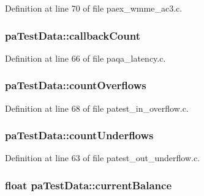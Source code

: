 Definition at line 70 of file paex\+\_\+wmme\+\_\+ac3.\+c.

\subsubsection[{\texorpdfstring{callback\+Count}{callbackCount}}]{ pa\+Test\+Data\+::callback\+Count}\hypertarget{structpa_test_data_a442020960f72390def205fc39be98203}{}\label{structpa_test_data_a442020960f72390def205fc39be98203}


Definition at line 66 of file paqa\+\_\+latency.\+c.

\subsubsection[{\texorpdfstring{count\+Overflows}{countOverflows}}]{ pa\+Test\+Data\+::count\+Overflows}\hypertarget{structpa_test_data_af4d9ebcaf05bdb774f243fdf07522f14}{}\label{structpa_test_data_af4d9ebcaf05bdb774f243fdf07522f14}


Definition at line 68 of file patest\+\_\+in\+\_\+overflow.\+c.

\subsubsection[{\texorpdfstring{count\+Underflows}{countUnderflows}}]{ pa\+Test\+Data\+::count\+Underflows}\hypertarget{structpa_test_data_aa878bdf823ef3eb32c03880579f41296}{}\label{structpa_test_data_aa878bdf823ef3eb32c03880579f41296}


Definition at line 63 of file patest\+\_\+out\+\_\+underflow.\+c.

\subsubsection[{\texorpdfstring{current\+Balance}{currentBalance}}]{\setlength{\rightskip}{0pt plus 5cm}float pa\+Test\+Data\+::current\+Balance}\hypertarget{structpa_test_data_a6a8bbddeb7e157a52402045c07aaf224}{}\label{structpa_test_data_a6a8bbddeb7e157a52402045c07aaf224}


